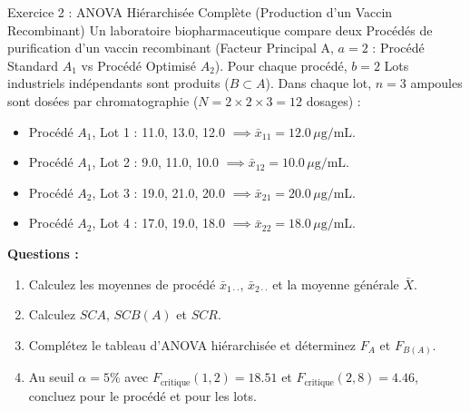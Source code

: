 \documentclass[11pt,a4paper]{article}
\begin{document}
\begin{exercicebox}{Exercice 2 : ANOVA Hiérarchisée Complète (Production d'un Vaccin Recombinant)}
Un laboratoire biopharmaceutique compare deux Procédés de purification d'un vaccin recombinant (Facteur Principal A, $a = 2$ : Procédé Standard $A_1$ vs Procédé Optimisé $A_2$). Pour chaque procédé, $b = 2$ Lots industriels indépendants sont produits ($B \subset A$). Dans chaque lot, $n = 3$ ampoules sont dosées par chromatographie ($N = 2 \times 2 \times 3 = 12$ dosages) :
\begin{itemize}
  \item Procédé $A_1$, Lot 1 : 11.0, 13.0, 12.0 $\implies \bar{x}_{11} = 12.0\,\mu\text{g/mL}$.
  \item Procédé $A_1$, Lot 2 : 9.0, 11.0, 10.0 $\implies \bar{x}_{12} = 10.0\,\mu\text{g/mL}$.
  \item Procédé $A_2$, Lot 3 : 19.0, 21.0, 20.0 $\implies \bar{x}_{21} = 20.0\,\mu\text{g/mL}$.
  \item Procédé $A_2$, Lot 4 : 17.0, 19.0, 18.0 $\implies \bar{x}_{22} = 18.0\,\mu\text{g/mL}$.
\end{itemize}
\textbf{Questions :}
\begin{enumerate}[label=\textbf{\alph*.}]
  \item Calculez les moyennes de procédé $\bar{x}_{1\cdot\cdot}$, $\bar{x}_{2\cdot\cdot}$ et la moyenne générale $\bar{X}$.
  \item Calculez $SCA$, $SCB(A)$ et $SCR$.
  \item Complétez le tableau d'ANOVA hiérarchisée et déterminez $F_A$ et $F_{B(A)}$.
  \item Au seuil $\alpha = 5\%$ avec $F_{\text{critique}}(1, 2) = 18.51$ et $F_{\text{critique}}(2, 8) = 4.46$, concluez pour le procédé et pour les lots.
\end{enumerate}
\end{exercicebox}
\end{document}
